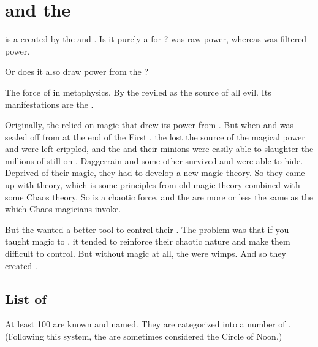 \section{\Itzach and the \Qliphoth}
\Itzach{} is a  created by the  and . 
Is it purely a  for \Erebos? 
\Itzach was raw \bane power, whereas \iquin was filtered \bane power. 

Or does it also draw power from the ?

The force of  in  metaphysics. 
By the  reviled as the source of all evil. 
Its manifestations are the .

Originally, the \banes{} relied on magic that drew its power from \Erebos{}. But when \Miith{} and \Nyx{} was sealed off from \Erebos{} at the end of the First \Banewar, the \banes{} lost the source of the magical power and were left crippled, and the \dragons{} and their minions were easily able to slaughter the millions of \banes{} still on \Miith{}. Daggerrain and some other \banelords{} survived and were able to hide. Deprived of their magic, they had to develop a new magic theory. So they came up with \nieur{} theory, which is some principles from old \bane{} magic theory combined with some Chaos theory. So \nieur{} is a chaotic force, and the \Kliffoth{} are more or less the same as the  which Chaos magicians invoke. 

But the \banes{} wanted a better tool to control their \humans{}. The problem was that if you taught \nieur{} magic to \humans{}, it tended to reinforce their chaotic nature and make them difficult to control. But without magic at all, the \humans{} were wimps. 
And so they created . 








\subsection{List of \Qliphoth}
At least 100 \qliphoth{} are known and named. 
They are categorized into a number of . 
(Following this system, the  are sometimes considered the Circle of Noon.) 


